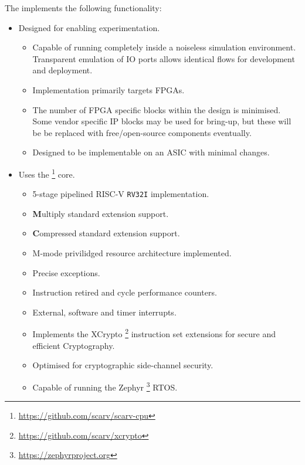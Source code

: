 
The \SCARVSOC implements the following functionality:

\begin{itemize}

\item Designed for enabling experimentation.
    
    \begin{itemize}
    \item Capable of running completely inside a noiseless simulation
        environment. Transparent emulation of IO ports allows identical
        flows for development and deployment.

    \item Implementation primarily targets FPGAs.

    \item The number of FPGA specific blocks within the design is
        minimised.  Some vendor specific IP blocks may be used for
        bring-up, but these will be be replaced with free/open-source
        components eventually.

    \item Designed to be implementable on an ASIC with minimal changes.
    \end{itemize}

\item Uses the \SCARVCPU \footnote{\url{https://github.com/scarv/scarv-cpu}}
      core.

    \begin{itemize}
    \item 5-stage pipelined RISC-V {\tt RV32I} implementation.
    \item {\bf M}ultiply standard extension support.
    \item {\bf C}ompressed standard extension support.
    \item M-mode privilidged resource architecture implemented.
    \item Precise exceptions.
    \item Instruction retired and cycle performance counters.
    \item External, software and timer interrupts.
    \item Implements the XCrypto
        \footnote{\url{https://github.com/scarv/xcrypto}}
        instruction set extensions for secure and efficient Cryptography.
    \item Optimised for cryptographic side-channel security.
    \item Capable of running the Zephyr
        \footnote{\url{https://zephyrproject.org}}
        RTOS.
    \end{itemize}


\end{itemize}
